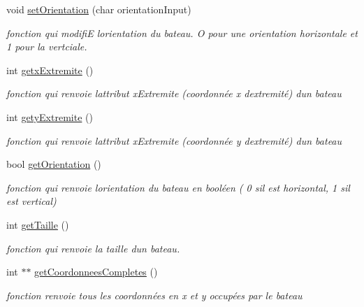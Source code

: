 \begin{DoxyCompactItemize}
void \mbox{\hyperlink{class_bateau_a0c88ac8759c24674a23b7523cb3f6667}{set\+Orientation}} (char orientation\+Input)
\begin{DoxyCompactList}\small\item\em fonction qui modifiE l\textquotesingle{}orientation du bateau. O pour une orientation horizontale et 1 pour la vertciale. \end{DoxyCompactList}\item 
int \mbox{\hyperlink{class_bateau_ad8a7212a50596757a10a429ed69400ce}{getx\+Extremite}} ()
\begin{DoxyCompactList}\small\item\em fonction qui renvoie l\textquotesingle{}attribut x\+Extremite (coordonnée x d\textquotesingle{}extremité) d\textquotesingle{}un bateau \end{DoxyCompactList}\item 
int \mbox{\hyperlink{class_bateau_a326527275685c457dd95fd1a71924b21}{gety\+Extremite}} ()
\begin{DoxyCompactList}\small\item\em fonction qui renvoie l\textquotesingle{}attribut x\+Extremite (coordonnée y d\textquotesingle{}extremité) d\textquotesingle{}un bateau \end{DoxyCompactList}\item 
bool \mbox{\hyperlink{class_bateau_a693e60e6b97d17a04b3f10de4e68f741}{get\+Orientation}} ()
\begin{DoxyCompactList}\small\item\em fonction qui renvoie l\textquotesingle{}orientation du bateau en booléen ( 0 s\textquotesingle{}il est horizontal, 1 s\textquotesingle{}il est vertical) \end{DoxyCompactList}\item 
int \mbox{\hyperlink{class_bateau_a9f0b81c06a5760d0aa40bed0cb9d2a58}{get\+Taille}} ()
\begin{DoxyCompactList}\small\item\em fonction qui renvoie la taille d\textquotesingle{}un bateau. \end{DoxyCompactList}\item 
int $\ast$$\ast$ \mbox{\hyperlink{class_bateau_a55c31fbdc2dc0c92786583d9bbd14985}{get\+Coordonnees\+Completes}} ()
\begin{DoxyCompactList}\small\item\em fonction renvoie tous les coordonnées en x et y occupées par le bateau \end{DoxyCompactList}\end{DoxyCompactItemize}
